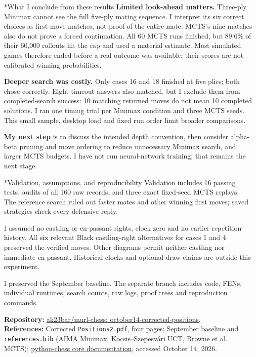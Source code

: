 \documentclass[10pt,letterpaper]{article}
\makeatletter
\renewcommand\section{\@startsection{section}{1}{0pt}{10pt}{5pt}{\normalfont\large\bfseries}}
\makeatother
\begin{document}
\section*{What I conclude from these results}
\textbf{Limited look-ahead matters.} Three-ply Minimax cannot see the full five-ply mating sequence. I interpret its six correct choices as first-move matches, not proof of the entire mate. MCTS's nine matches also do not prove a forced continuation. All 60 MCTS runs finished, but 89.6\% of their 60,000 rollouts hit the cap and used a material estimate. Most simulated games therefore ended before a real outcome was available; their scores are not calibrated winning probabilities.

\textbf{Deeper search was costly.} Only cases 16 and 18 finished at five plies; both chose correctly. Eight timeout answers also matched, but I exclude them from completed-search success: 10 matching returned moves do not mean 10 completed solutions. I ran one timing trial per Minimax condition and three MCTS seeds. This small sample, desktop load and fixed run order limit broader comparisons.

\textbf{My next step} is to discuss the intended depth convention, then consider alpha-beta pruning and move ordering to reduce unnecessary Minimax search, and larger MCTS budgets. I have not run neural-network training; that remains the next stage.

\section*{Validation, assumptions, and reproducibility}
Validation includes 16 passing tests, audits of all 160 raw records, and three exact fixed-seed MCTS replays. The reference search ruled out faster mates and other winning first moves; saved strategies check every defensive reply.

I assumed no castling or en-passant rights, clock zero and no earlier repetition history. All six relevant Black castling-right alternatives for cases 1 and 4 preserved the verified moves. Other diagrams permit neither castling nor immediate en-passant. Historical clocks and optional draw claims are outside this experiment.

I preserved the September baseline. The separate branch includes code, FENs, individual runtimes, search counts, raw logs, proof trees and reproduction commands.

{\small\textbf{Repository:} \href{https://github.com/ak23bar/murl-chess/tree/october14-corrected-positions}{ak23bar/murl-chess: october14-corrected-positions}.\\
\textbf{References:} Corrected \texttt{Positions2.pdf}, four pages; September baseline and \texttt{references.bib} (AIMA Minimax, Kocsis--Szepesv\'ari UCT, Browne et al. MCTS); \href{https://python-chess.readthedocs.io/en/latest/core.html}{python-chess core documentation}, accessed October 14, 2026.}
\end{document}
